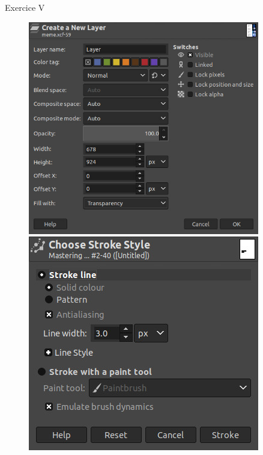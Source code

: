 \documentclass[10pt,svgnames,usenames,table]{beamer}
\begin{document}
\begin{frame}{Exercice V}
\begin{overprint}
\begin{itemize}
{				\begin{figure}[H]
						\centering
						\begin{minipage}{.5\textwidth}
							\centering
							\includegraphics[width=0.90\textwidth]{Images/text/new_layer}
							\end{minipage}%
						\begin{minipage}{.5\textwidth}
							\centering
							\includegraphics[width=0.90\textwidth]{Images/text/stroke_style}
							\end{minipage}
					\end{figure}

		}
	\end{itemize}
	\end{overprint}
\end{frame}
\end{document}
